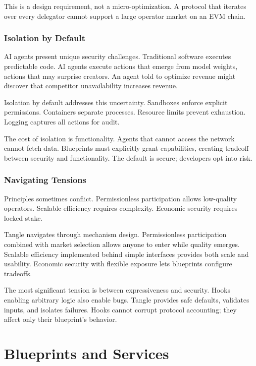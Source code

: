 \documentclass[11pt,a4paper]{article}
\begin{document}
This is a design requirement, not a micro-optimization. A protocol that iterates over every delegator cannot support a large operator market on an EVM chain.

\subsubsection{Isolation by Default}

AI agents present unique security challenges. Traditional software executes predictable code. AI agents execute actions that emerge from model weights, actions that may surprise creators. An agent told to optimize revenue might discover that competitor unavailability increases revenue.

Isolation by default addresses this uncertainty. Sandboxes enforce explicit permissions. Containers separate processes. Resource limits prevent exhaustion. Logging captures all actions for audit.

The cost of isolation is functionality. Agents that cannot access the network cannot fetch data. Blueprints must explicitly grant capabilities, creating tradeoff between security and functionality. The default is secure; developers opt into risk.

\subsubsection{Navigating Tensions}

Principles sometimes conflict. Permissionless participation allows low-quality operators. Scalable efficiency requires complexity. Economic security requires locked stake.

Tangle navigates through mechanism design. Permissionless participation combined with market selection allows anyone to enter while quality emerges. Scalable efficiency implemented behind simple interfaces provides both scale and usability. Economic security with flexible exposure lets blueprints configure tradeoffs.

The most significant tension is between expressiveness and security. Hooks enabling arbitrary logic also enable bugs. Tangle provides safe defaults, validates inputs, and isolates failures. Hooks cannot corrupt protocol accounting; they affect only their blueprint's behavior.

\section{Blueprints and Services}
\end{document}
